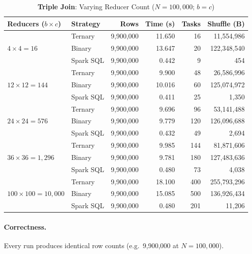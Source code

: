 \documentclass[11pt,a4paper]{article}
\begin{document}
\begin{table}[htbp]
\centering
\caption{\textbf{Triple Join}: Varying Reducer Count ($N = 100{,}000$; $b = c$)}
\label{tab:triple_reducers}
\begin{tabular}{llrrrr}
\toprule
\textbf{Reducers ($b \times c$)} & \textbf{Strategy} & \textbf{Rows} & \textbf{Time (s)} & \textbf{Tasks} & \textbf{Shuffle (B)} \\
\midrule
\multirow{3}{*}{$4\times4=16$}
 & Ternary             & 9,900,000 & 11.650 & 16  & 11,554,986  \\
 & Binary              & 9,900,000 & 13.647 & 20  & 122,348,540 \\
 & Spark SQL           & 9,900,000 & 0.442  & 9   & 454         \\
\midrule
\multirow{3}{*}{$12\times12=144$}
 & Ternary             & 9,900,000 & 9.900  & 48  & 26,586,996  \\
 & Binary              & 9,900,000 & 10.016 & 60  & 125,074,972 \\
 & Spark SQL           & 9,900,000 & 0.411  & 25  & 1,350       \\
\midrule
\multirow{3}{*}{$24\times24=576$}
 & Ternary             & 9,900,000 & 9.696  & 96  & 53,141,488  \\
 & Binary              & 9,900,000 & 9.779  & 120 & 126,096,688 \\
 & Spark SQL           & 9,900,000 & 0.432  & 49  & 2,694       \\
\midrule
\multirow{3}{*}{$36\times36=1{,}296$}
 & Ternary             & 9,900,000 & 9.985  & 144 & 81,871,606  \\
 & Binary              & 9,900,000 & 9.781  & 180 & 127,483,636 \\
 & Spark SQL           & 9,900,000 & 0.480  & 73  & 4,038       \\
\midrule
\multirow{3}{*}{$100\times100=10{,}000$}
 & Ternary             & 9,900,000 & 18.100 & 400 & 255,793,296 \\
 & Binary              & 9,900,000 & 15.085 & 500 & 136,926,434 \\
 & Spark SQL           & 9,900,000 & 0.480  & 201 & 11,206      \\
\bottomrule
\end{tabular}
\end{table}

\paragraph{Correctness.}
Every run produces identical row counts (e.g.\ 9,900,000 at $N = 100{,}000$).
\end{document}
